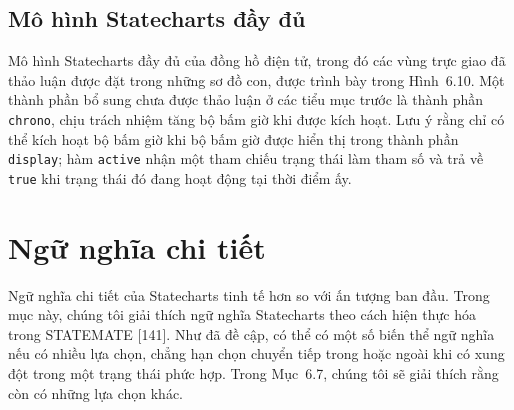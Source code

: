 \subsection{Mô hình Statecharts đầy đủ}
Mô hình Statecharts đầy đủ của đồng hồ điện tử, trong đó các vùng trực giao đã thảo luận được đặt trong những sơ đồ con, được trình bày trong Hình~6.10. Một thành phần bổ sung chưa được thảo luận ở các tiểu mục trước là thành phần \texttt{chrono}, chịu trách nhiệm tăng bộ bấm giờ khi được kích hoạt. Lưu ý rằng chỉ có thể kích hoạt bộ bấm giờ khi bộ bấm giờ được hiển thị trong thành phần \texttt{display}; hàm \texttt{active} nhận một tham chiếu trạng thái làm tham số và trả về \texttt{true} khi trạng thái đó đang hoạt động tại thời điểm ấy.


\section{Ngữ nghĩa chi tiết}
Ngữ nghĩa chi tiết của Statecharts tinh tế hơn so với ấn tượng ban đầu. Trong mục này, chúng tôi giải thích ngữ nghĩa Statecharts theo cách hiện thực hóa trong STATEMATE [141]. Như đã đề cập, có thể có một số biến thể ngữ nghĩa nếu có nhiều lựa chọn, chẳng hạn chọn chuyển tiếp trong hoặc ngoài khi có xung đột trong một trạng thái phức hợp. Trong Mục~6.7, chúng tôi sẽ giải thích rằng còn có những lựa chọn khác.

